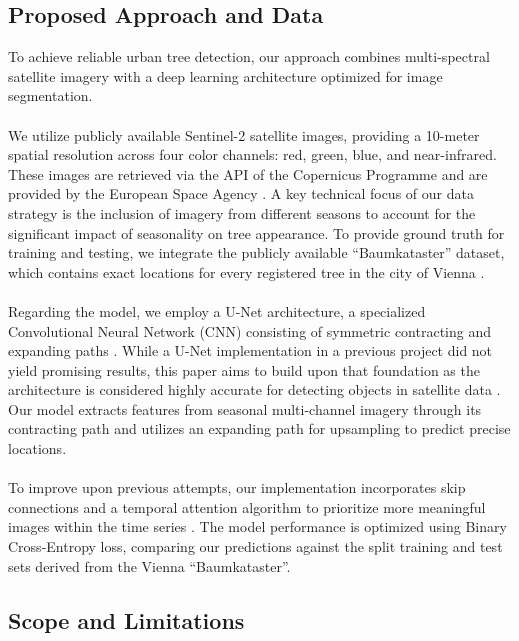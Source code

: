 \subsection{Proposed Approach and Data}

To achieve reliable urban tree detection, our approach combines multi-spectral satellite imagery with a deep learning architecture optimized for image segmentation. \\
\\
We utilize publicly available Sentinel-2 satellite images, providing a 10-meter spatial resolution across four color channels: red, green, blue, and near-infrared. These images are retrieved via the API of the Copernicus Programme and are provided by the European Space Agency \cite{copernicus2025}. A key technical focus of our data strategy is the inclusion of imagery from different seasons to account for the significant impact of seasonality on tree appearance. To provide ground truth for training and testing, we integrate the publicly available ``Baumkataster'' dataset, which contains exact locations for every registered tree in the city of Vienna \cite{baumkataster2025}. \\
\\
Regarding the model, we employ a U-Net architecture, a specialized Convolutional Neural Network (CNN) consisting of symmetric contracting and expanding paths \cite{aramendia2024}. While a U-Net implementation in a previous project did not yield promising results, this paper aims to build upon that foundation as the architecture is considered highly accurate for detecting objects in satellite data \cite{pesek2024convolution, garnot2021panoptic}. Our model extracts features from seasonal multi-channel imagery through its contracting path and utilizes an expanding path for upsampling to predict precise locations. \\
\\
To improve upon previous attempts, our implementation incorporates skip connections and a temporal attention algorithm to prioritize more meaningful images within the time series \cite{garnot2021panoptic}. The model performance is optimized using Binary Cross-Entropy loss, comparing our predictions against the split training and test sets derived from the Vienna ``Baumkataster''.

\subsection{Scope and Limitations}

